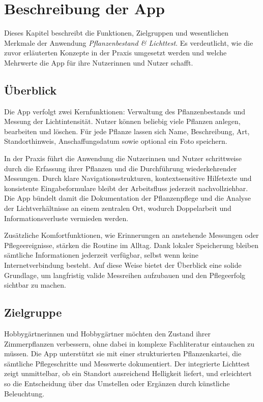 \documentclass[14pt,a4paper]{report}
\begin{document}
\chapter{Beschreibung der App}
Dieses Kapitel beschreibt die Funktionen, Zielgruppen und wesentlichen Merkmale der Anwendung \textit{Pflanzenbestand \& Lichttest}. Es verdeutlicht, wie die zuvor erläuterten Konzepte in der Praxis umgesetzt werden und welche Mehrwerte die App für ihre Nutzerinnen und Nutzer schafft.

\section{Überblick}
Die App verfolgt zwei Kernfunktionen: Verwaltung des Pflanzenbestands und Messung der Lichtintensität. Nutzer können beliebig viele Pflanzen anlegen, bearbeiten und löschen. Für jede Pflanze lassen sich Name, Beschreibung, Art, Standorthinweis, Anschaffungsdatum sowie optional ein Foto speichern.

In der Praxis führt die Anwendung die Nutzerinnen und Nutzer schrittweise durch die Erfassung ihrer Pflanzen und die Durchführung wiederkehrender Messungen. Durch klare Navigationsstrukturen, kontextsensitive Hilfetexte und konsistente Eingabeformulare bleibt der Arbeitsfluss jederzeit nachvollziehbar. Die App bündelt damit die Dokumentation der Pflanzenpflege und die Analyse der Lichtverhältnisse an einem zentralen Ort, wodurch Doppelarbeit und Informationsverluste vermieden werden.

Zusätzliche Komfortfunktionen, wie Erinnerungen an anstehende Messungen oder Pflegeereignisse, stärken die Routine im Alltag. Dank lokaler Speicherung bleiben sämtliche Informationen jederzeit verfügbar, selbst wenn keine Internetverbindung besteht. Auf diese Weise bietet der Überblick eine solide Grundlage, um langfristig valide Messreihen aufzubauen und den Pflegeerfolg sichtbar zu machen.

\section{Zielgruppe}
Hobbygärtnerinnen und Hobbygärtner möchten den Zustand ihrer Zimmerpflanzen verbessern, ohne dabei in komplexe Fachliteratur eintauchen zu müssen. Die App unterstützt sie mit einer strukturierten Pflanzenkartei, die sämtliche Pflegeschritte und Messwerte dokumentiert. Der integrierte Lichttest zeigt unmittelbar, ob ein Standort ausreichend Helligkeit liefert, und erleichtert so die Entscheidung über das Umstellen oder Ergänzen durch künstliche Beleuchtung.
\end{document}
